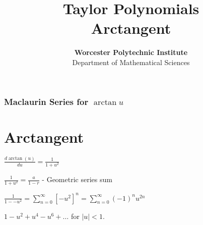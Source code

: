 \documentclass{beamer}
\title{Taylor Polynomials \\ Arctangent}
\author[Calculus Labs]{{\textbf{Worcester Polytechnic Institute}\\ Department of Mathematical Sciences}}
\institute[WPI]
{Calculus Labs}
\date{}
\begin{document}
\frame{\titlepage}















\begin{frame}
\frametitle{Maclaurin Series for $\arctan u$} 
\section{Arctangent}
$\displaystyle \frac{d \arctan(u)}{du} = \frac{1}{1+u^2}$ \newline

\vspace{0.3 in}

$\displaystyle  \frac{1}{1+u^2} =\frac{a}{1-r}$ \hspace{2 cm}- Geometric series sum \newline

\vspace{0.3 in}

$\displaystyle  \frac{1}{1--u^2} = \sum_{n=0}^\infty [-u^2]^n = \sum_{n=0}^\infty (-1)^n u^{2n}$ \newline

\vspace{0.3 in}

$ 1 -  u^2 + u^4 - u^6+\dots$  for $|u| < 1$.


\vspace{0.5 cm}


\vspace{6.5 cm}
\end{frame}
\end{document}
